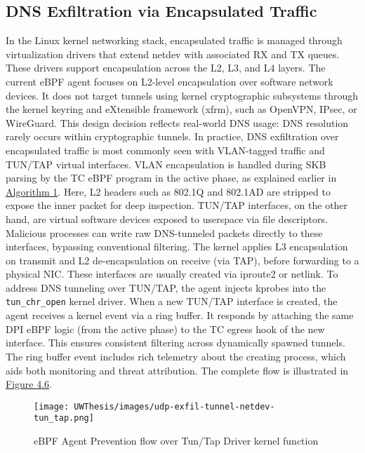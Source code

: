 \documentclass [11pt, proquest] {uwthesis}[2020/02/24]
\begin{document}
\subsection{DNS Exfiltration via Encapsulated Traffic}
\label{sec:encap}
In the Linux kernel networking stack, encapsulated traffic is managed through virtualization drivers that extend netdev with associated RX and TX queues. These drivers support encapsulation across the L2, L3, and L4 layers. The current eBPF agent focuses on L2-level encapsulation over software network devices. It does not target tunnels using kernel cryptographic subsystems through the kernel keyring and eXtensible framework (xfrm), such as OpenVPN, IPsec, or WireGuard. This design decision reflects real-world DNS usage: DNS resolution rarely occurs within cryptographic tunnels. In practice, DNS exfiltration over encapsulated traffic is most commonly seen with VLAN-tagged traffic and TUN/TAP virtual interfaces. VLAN encapsulation is handled during SKB parsing by the TC eBPF program in the active phase, as explained earlier in \hyperref[sec:alg1]{Algorithm 1}. Here, L2 headers such as 802.1Q and 802.1AD are stripped to expose the inner packet for deep inspection. TUN/TAP interfaces, on the other hand, are virtual software devices exposed to userspace via file descriptors. Malicious processes can write raw DNS-tunneled packets directly to these interfaces, bypassing conventional filtering. The kernel applies L3 encapsulation on transmit and L2 de-encapsulation on receive (via TAP), before forwarding to a physical NIC. These interfaces are usually created via iproute2 or netlink. To address DNS tunneling over TUN/TAP, the agent injects kprobes into the \texttt{tun\_chr\_open} kernel driver. When a new TUN/TAP interface is created, the agent receives a kernel event via a ring buffer. It responds by attaching the same DPI eBPF logic (from the active phase) to the TC egress hook of the new interface. This ensures consistent filtering across dynamically spawned tunnels. The ring buffer event includes rich telemetry about the creating process, which aids both monitoring and threat attribution. The complete flow is illustrated in \hyperref[sec:data_plane_tunnel_netdev]{Figure 4.6}.

\begin{figure}[htbp]
\centering
\texttt{[image: UWThesis/images/udp-exfil-tunnel-netdev-tun\_tap.png]}
\caption{eBPF Agent Prevention flow over Tun/Tap Driver kernel function}
\label{sec:data_plane_tunnel_netdev}
\end{figure}
\end{document}
